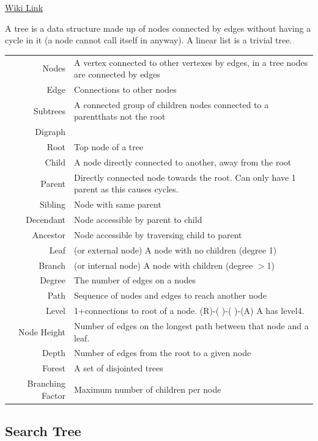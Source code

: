 \documentclass{notes}
\begin{document}
	\href{https://en.wikipedia.org/wiki/Tree_(data_structure)}{Wiki Link}
	
	A tree is a data structure made up of nodes connected by edges without having a cycle in it (a node cannot call itself in anyway). A linear list is a trivial tree.

\begin{table}
	\begin{tabular}{r p{}}
		Nodes&A vertex connected to other vertexes by edges, in a tree nodes are connected by edges\\
		Edge&Connections to other nodes\\
		Subtrees&A connected group of children nodes connected to a parentthats not the root\\
		Digraph&\\
		Root& Top node of a tree\\
		Child&A node directly connected to another, away from the root\\
		Parent&Directly connected node towards the root. Can only have 1 parent as this causes cycles.\\
		Sibling&Node with same parent\\
		Decendant&Node accessible by parent to child\\
		Ancestor&Node accessible by traversing child to parent\\
		Leaf&(or external node) A node with no children (degree 1)\\
		Branch&(or internal node) A node with children (degree $>$1)\\
		Degree&The number of edges on a nodes\\
		Path&Sequence of nodes and edges to reach another node\\
		Level&1+connections to root of a node. (R)-( )-( )-(A) A has level4.\\
		Node Height&Number of edges on the longest path between that node and a leaf.\\
		Depth&Number of edges from the root to a given node\\
		Forest&A set of disjointed trees\\
		Branching Factor&Maximum number of children per node\\

	\end{tabular}
\end{table}

\subsection{Search Tree}
\end{document}

